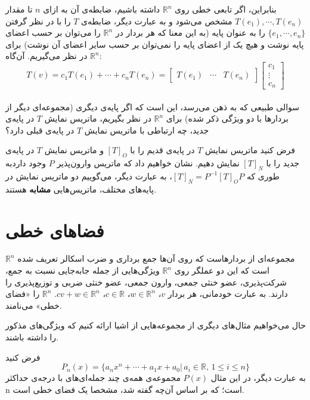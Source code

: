 بنابراین، اگر تابعی خطی روی $\mathbb{R}^n$ داشته باشیم، ضابطه‌ی آن به ازای $n$ تا مقدار $T(e_{1}), \cdots, T(e_{n})$ مشخص می‌شود و به عبارت دیگر، ضابطه‌ی $T$ را با در نظر گرفتن $\{e_{1},\cdots,e_{n}\}$ را به عنوان پایه (به این معنا که هر بردار در $\mathbb{R}^n$ را می‌توان بر حسب اعضا‌ی پایه نوشت و هیچ یک از اعضا‌ی پایه را نمی‌توان بر حسب سایر اعضا‌ی آن نوشت) برای $\mathbb{R}^n$ در نظر می‌گیریم. آن‌گاه:
\begin{equation}
T(v) = c_{1}T(e_{1}) + \cdots + c_{n}T(e_{n}) = \begin{bmatrix}
T(e_{1}) & \cdots & T(e_{n})
\end{bmatrix}\begin{bmatrix}
c_{1}\\\vdots\\
c_{n}
\end{bmatrix}
\end{equation}
\\
سوالی طبیعی که به ذهن می‌رسد، این است که اگر پایه‌ی دیگری (مجموعه‌ای دیگر از بردار‌ها با دو ویژگی ذکر شده) برای $\mathbb{R}^n$ در نظر بگیریم، ماتریس نمایش $T$ در پایه‌ی جدید، چه ارتباطی با ماتریس نمایش $T$ در پایه‌ی قبلی دارد؟
\begin{definition}
فرض کنید ماتریس نمایش $T$ در پایه‌ی قدیم را با $[T]_{O}$ و ماتریس نمایش $T$ در پایه‌ی جدید را با $[T]_{N}$ نمایش دهیم. نشان خواهیم داد که ماتریس وارون‌پذیر $P$ وجود دارد\linebreak به طوری که $[T]_{N} = P^{-1} [T]_{O}P$، به عبارت دیگر، می‌گوییم دو ماتریس نمایش در پایه‌های مختلف، ماتریس‌هایی \textbf{مشابه} هستند.
\end{definition}

\section{فضا‌های خطی}
$\mathbb{R}^n$ مجموعه‌ای از بردار‌هاست که روی آن‌ها جمع برداری و ضرب اسکالر تعریف شده است که این دو عملگر روی $\mathbb{R}^n$ ویژگی‌هایی از جمله جا‌به‌جایی نسبت به جمع، شرکت‌پذیری، عضو خنثی جمعی، وارون جمعی، عضو خنثی ضربی و توزیع‌پذیری را دارند. به عبارت خودمانی، هر بردار $v$، $w\in \mathbb{R}^n$، $c\in \mathbb{R}$، $cv+w \in \mathbb{R}^n$. $\mathbb{R}^n$ را «فضا‌ی خطی» می‌نامند.

حال می‌خواهیم مثال‌های دیگری از مجموعه‌هایی از اشیا ارائه کنیم که ویژگی‌های مذکور را داشته باشند.

\begin{example}
	فرض کنید
	\begin{equation*}
		P_{n}(x) = \{ a_{n}x^n + \cdots + a_{1}x + a_{0} |\,a_{i}\in \mathbb{R},\, 1 \le i \le n \}
	\end{equation*}
	به عبارت دیگر، در این مثال $P(x)$ مجموعه‌ی همه‌ی چند جمله‌ای‌های با درجه‌ی حداکثر n است؛ که بر اساس آن‌چه گفته شد، مشخصا یک فضا‌ی خطی است.
\end{example}

